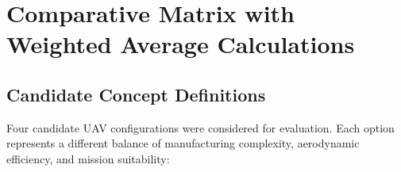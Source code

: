 \chapter{Comparative Matrix with Weighted Average Calculations}
\label{chap:matrix}

\section{Candidate Concept Definitions}

Four candidate UAV configurations were considered for evaluation. Each option represents a different balance of manufacturing complexity, aerodynamic efficiency, and mission suitability:

